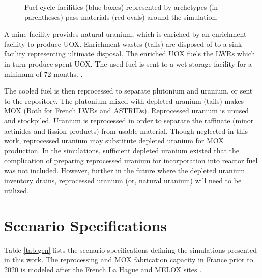 \begin{figure}
{
        
                }
                \caption{Fuel cycle facilities (blue boxes) represented by 
                        \Cyclus archetypes (in parentheses) pass materials (red 
                ovals) around the simulation.} 
                \label{diag:fc}
\end{figure}

A mine facility provides natural uranium, which is enriched by an enrichment
facility to produce \gls{UOX}. Enrichment wastes (tails) are disposed of to a 
sink facility representing ultimate disposal. The enriched \gls{UOX} fuels
the \glspl{LWR} which in turn produce spent \gls{UOX}. The used fuel
is sent to a wet storage facility for a minimum of 72 months. \cite{carre_overview_2009}.

The cooled fuel is then reprocessed to separate plutonium and uranium,
or sent to the repository.
The plutonium mixed with depleted uranium (tails) makes \gls{MOX} (Both for
French \glspl{LWR} and \glspl{ASTRID}).
Reprocessed uranium is unused and stockpiled. Uranium is reprocessed
in order to separate the raffinate (minor actinides and fission products)
from usable material. Though neglected in this work, reprocessed
uranium may substitute depleted uranium for \gls{MOX} production. In the
simulations, sufficient depleted uranium existed that the complication of
preparing reprocessed uranium for incorporation into reactor fuel
was not included. However, further in the future where the depleted
uranium inventory drains, reprocessed uranium (or, natural uranium) will need to be utilized. 

\FloatBarrier

\section{Scenario Specifications}
Table \ref{tab:gen} lists the scenario specifications defining the
simulations presented in this work.
The reprocessing and \gls{MOX} fabrication capacity in France
prior to 2020 is modeled after the 
French La Hague and MELOX sites \cite{schneider_spent_2008, hugelmann_melox_1999}.


